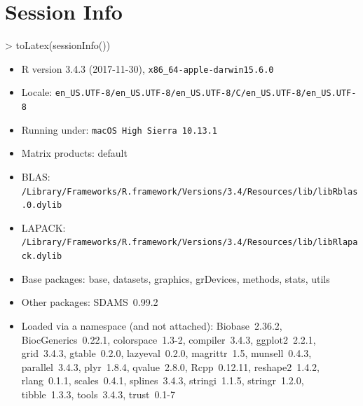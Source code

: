 \documentclass[12pt]{article}
\begin{document}
\section{Session Info}

\begin{Schunk}
\begin{Sinput}
> toLatex(sessionInfo())
\end{Sinput}
\begin{itemize}\raggedright
  \item R version 3.4.3 (2017-11-30), \verb|x86_64-apple-darwin15.6.0|
  \item Locale: \verb|en_US.UTF-8/en_US.UTF-8/en_US.UTF-8/C/en_US.UTF-8/en_US.UTF-8|
  \item Running under: \verb|macOS High Sierra 10.13.1|
  \item Matrix products: default
  \item BLAS: \verb|/Library/Frameworks/R.framework/Versions/3.4/Resources/lib/libRblas.0.dylib|
  \item LAPACK: \verb|/Library/Frameworks/R.framework/Versions/3.4/Resources/lib/libRlapack.dylib|
  \item Base packages: base, datasets, graphics, grDevices, methods,
    stats, utils
  \item Other packages: SDAMS~0.99.2
  \item Loaded via a namespace (and not attached): Biobase~2.36.2,
    BiocGenerics~0.22.1, colorspace~1.3-2, compiler~3.4.3,
    ggplot2~2.2.1, grid~3.4.3, gtable~0.2.0, lazyeval~0.2.0,
    magrittr~1.5, munsell~0.4.3, parallel~3.4.3, plyr~1.8.4,
    qvalue~2.8.0, Rcpp~0.12.11, reshape2~1.4.2, rlang~0.1.1,
    scales~0.4.1, splines~3.4.3, stringi~1.1.5, stringr~1.2.0,
    tibble~1.3.3, tools~3.4.3, trust~0.1-7
\end{itemize}\end{Schunk}



\end{document}
